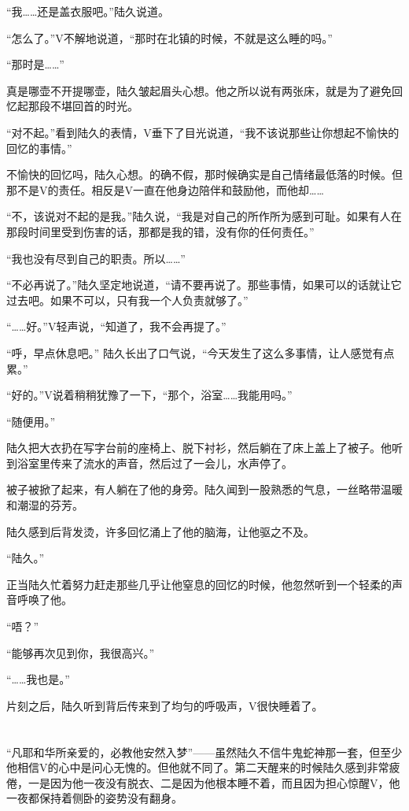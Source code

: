 “我……还是盖衣服吧。”陆久说道。

“怎么了。”V不解地说道，“那时在北镇的时候，不就是这么睡的吗。”

“那时是……”

真是哪壶不开提哪壶，陆久皱起眉头心想。他之所以说有两张床，就是为了避免回忆起那段不堪回首的时光。

“对不起。”看到陆久的表情，V垂下了目光说道，“我不该说那些让你想起不愉快的回忆的事情。”

不愉快的回忆吗，陆久心想。的确不假，那时候确实是自己情绪最低落的时候。但那不是V的责任。相反是V一直在他身边陪伴和鼓励他，而他却……

“不，该说对不起的是我。”陆久说，“我是对自己的所作所为感到可耻。如果有人在那段时间里受到伤害的话，那都是我的错，没有你的任何责任。”

“我也没有尽到自己的职责。所以……”

“不必再说了。”陆久坚定地说道，“请不要再说了。那些事情，如果可以的话就让它过去吧。如果不可以，只有我一个人负责就够了。”

“……好。”V轻声说，“知道了，我不会再提了。”

“呼，早点休息吧。” 陆久长出了口气说，“今天发生了这么多事情，让人感觉有点累。”

“好的。”V说着稍稍犹豫了一下，“那个，浴室……我能用吗。”

“随便用。”

陆久把大衣扔在写字台前的座椅上、脱下衬衫，然后躺在了床上盖上了被子。他听到浴室里传来了流水的声音，然后过了一会儿，水声停了。

被子被掀了起来，有人躺在了他的身旁。陆久闻到一股熟悉的气息，一丝略带温暖和潮湿的芬芳。

陆久感到后背发烫，许多回忆涌上了他的脑海，让他驱之不及。

“陆久。”

正当陆久忙着努力赶走那些几乎让他窒息的回忆的时候，他忽然听到一个轻柔的声音呼唤了他。

“唔？”

“能够再次见到你，我很高兴。”

“……我也是。”

片刻之后，陆久听到背后传来到了均匀的呼吸声，V很快睡着了。

\section*{}

“凡耶和华所亲爱的，必教他安然入梦”——虽然陆久不信牛鬼蛇神那一套，但至少他相信V的心中是问心无愧的。但他就不同了。第二天醒来的时候陆久感到非常疲倦，一是因为他一夜没有脱衣、二是因为他根本睡不着，而且因为担心惊醒V，他一夜都保持着侧卧的姿势没有翻身。

